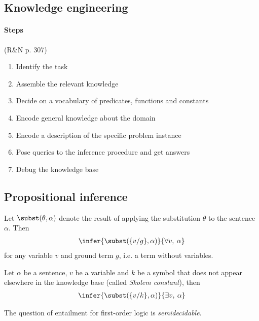 \documentclass{article}
\begin{document}
\subsection{Knowledge engineering}

\paragraph{Steps}(R\&N p. 307)
\begin{enumerate}
    \item Identify the task
    \item Assemble the relevant knowledge
    \item Decide on a vocabulary of predicates, functions and constants
    \item Encode general knowledge about the domain
    \item Encode a description of the specific problem instance
    \item Pose queries to the inference procedure and get answers
    \item Debug the knowledge base
\end{enumerate}

\subsection{Propositional inference}

\begin{theorem}
    Let $\subst(\theta, \alpha)$ denote the result of applying
    the substitution $\theta$ to the sentence $\alpha$. Then
    \begin{align*}
        \infer{\subst(\{v/g\},\alpha)}{\forall v,\:\alpha}
    \end{align*}
    for any variable $v$ and ground term $g$, i.e. a term without variables.
\end{theorem}

\begin{theorem}
    Let $\alpha$ be a sentence, $v$ be a variable and $k$ be a
    symbol that does not appear elsewhere in the knowledge base
    (called \emph{Skolem constant}), then
    \begin{align*}
        \infer{\subst(\{v/k\},\alpha)}{\exists v,\:\alpha}
    \end{align*}
\end{theorem}

\begin{theorem}[R\&N p. 325]
    The question of entailment for first-order logic is \emph{semidecidable}.
\end{theorem}
\end{document}
